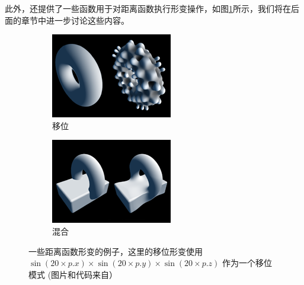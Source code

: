 此外，\cite{w:distance-function}还提供了一些函数用于对距离函数执行形变操作，如图\ref{f:df-disform}所示，我们将在后面的章节中进一步讨论这些内容。

\begin{figure}
	\begin{subfigure}[b]{0.5\textwidth}
		\includegraphics[width=\textwidth]{figures/df/displacement}
		\caption{移位}
	\end{subfigure}
	\begin{subfigure}[b]{0.5\textwidth}
		\includegraphics[width=\textwidth]{figures/df/blend}
		\caption{混合}
	\end{subfigure}
	\caption{一些距离函数形变的例子，这里的移位形变使用 $\sin(20 \times p.x)\times\sin(20\times p.y)\times\sin(20\times p.z)$ 作为一个移位模式 (图片和代码来自\cite{w:distance-function}）}
	\label{f:df-disform}
\end{figure}

